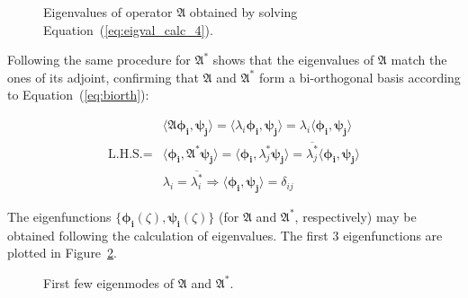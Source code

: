 \begin{figure}[!htbp]
    \centering
    
    \caption{Eigenvalues of operator $\mathfrak{A}$ obtained by solving Equation~(\ref{eq:eigval_calc_4}).}
    \label{fig:eigval_dist}
\end{figure}

Following the same procedure for $\mathfrak{A}^*$ shows that the eigenvalues of $\mathfrak{A}$ match the ones of its adjoint, confirming that $\mathfrak{A}$ and $\mathfrak{A}^*$ form a bi-orthogonal basis according to Equation~(\ref{eq:biorth}):

\begin{equation} \label{eq:biorth}
    \begin{aligned}
        &\langle \mathfrak{A} \bm{\phi_i}, \bm{\psi_j} \rangle = \langle \lambda_i \bm{\phi_i}, \bm{\psi_j} \rangle = \lambda_i \langle \bm{\phi_i}, \bm{\psi_j} \rangle \\
        \text{L.H.S.} = &\langle \bm{\phi_i}, \mathfrak{A}^* \bm{\psi_j} \rangle = \langle \bm{\phi_i}, \lambda_j^* \bm{\psi_j} \rangle = \overline{\lambda_j^*} \langle \bm{\phi_i}, \bm{\psi_j} \rangle \\
        &\lambda_i = \overline{\lambda_i^*} \Rightarrow \langle \bm{\phi_i}, \bm{\psi_j} \rangle = \delta_{ij}
    \end{aligned}
\end{equation}

The eigenfunctions $\{ \bm{\phi_i}(\zeta), \bm{\psi_i}(\zeta) \}$ (for $\mathfrak{A}$ and $\mathfrak{A}^*$, respectively) may be obtained following the calculation of eigenvalues. The first 3 eigenfunctions are plotted in Figure~\ref{fig:eigfun}. 

\begin{figure}[H]
    \centering
    
    \caption{First few eigenmodes of $\mathfrak{A}$ and $\mathfrak{A}^*$.}
    \label{fig:eigfun}
\end{figure}


